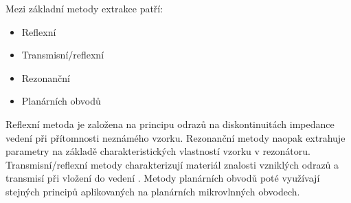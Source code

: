 Mezi základní metody extrakce patří:
\begin{itemize}
\item Reflexní
\item Transmisní/reflexní
\item Rezonanční
\item Planárních obvodů
\end{itemize}
Reflexní metoda je založena na principu odrazů na diskontinuitách impedance vedení při přítomnosti neznámého vzorku.
Rezonanční metody naopak extrahuje parametry na základě charakteristických vlastností vzorku v rezonátoru.
Transmisní/reflexní metody charakterizují materiál znalosti vzniklých odrazů a transmisí při vložení do vedení .
Metody planárních obvodů poté využívají stejných principů aplikovaných na planárních mikrovlnných obvodech.

